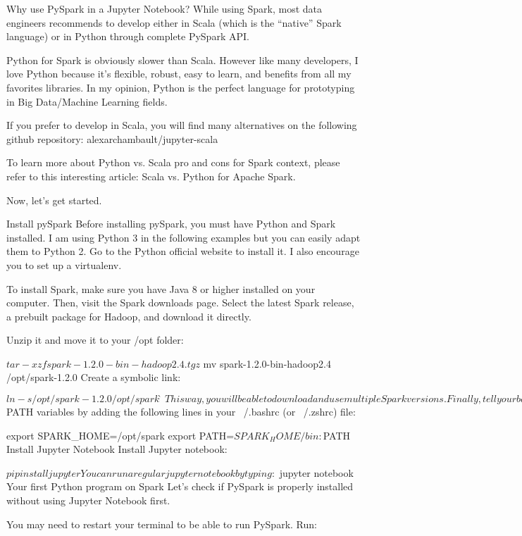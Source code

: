 Why use PySpark in a Jupyter Notebook?
While using Spark, most data engineers recommends to develop either in Scala (which is the “native” Spark language) or in Python through complete PySpark API.

Python for Spark is obviously slower than Scala. However like many developers, I love Python because it’s flexible, robust, easy to learn, and benefits from all my favorites libraries. In my opinion, Python is the perfect language for prototyping in Big Data/Machine Learning fields.

If you prefer to develop in Scala, you will find many alternatives on the following github repository: alexarchambault/jupyter-scala

To learn more about Python vs. Scala pro and cons for Spark context, please refer to this interesting article: Scala vs. Python for Apache Spark.

Now, let’s get started.

Install pySpark
Before installing pySpark, you must have Python and Spark installed. I am using Python 3 in the following examples but you can easily adapt them to Python 2. Go to the Python official website to install it. I also encourage you to set up a virtualenv.

To install Spark, make sure you have Java 8 or higher installed on your computer. Then, visit the Spark downloads page. Select the latest Spark release, a prebuilt package for Hadoop, and download it directly.

Unzip it and move it to your /opt folder:

$ tar -xzf spark-1.2.0-bin-hadoop2.4.tgz
$ mv spark-1.2.0-bin-hadoop2.4 /opt/spark-1.2.0
Create a symbolic link:

$ ln -s /opt/spark-1.2.0 /opt/spark̀
This way, you will be able to download and use multiple Spark versions.

Finally, tell your bash (or zsh, etc.) where to find Spark. To do so, configure your $PATH variables by adding the following lines in your ~/.bashrc (or ~/.zshrc) file:

export SPARK_HOME=/opt/spark
export PATH=$SPARK_HOME/bin:$PATH
Install Jupyter Notebook
Install Jupyter notebook:

$ pip install jupyter
You can run a regular jupyter notebook by typing:

$ jupyter notebook
Your first Python program on Spark
Let’s check if PySpark is properly installed without using Jupyter Notebook first.

You may need to restart your terminal to be able to run PySpark. Run:

